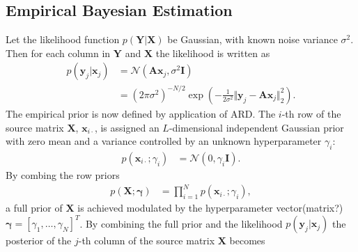 \subsection{Empirical Bayesian Estimation}
Let the likelihood function $p(\mathbf{Y} \vert \mathbf{X})$ be Gaussian, with known noise variance $\sigma^2$. 
Then for each column in $\mathbf{Y}$ and $\mathbf{X}$ the likelihood is written as
\begin{align*}
p(\mathbf{y}_{j} \vert \mathbf{x}_{j}) &= \mathcal{N}(\mathbf{Ax}_{j}, \sigma^2 \mathbf{I}) \\
&= (2 \pi \sigma^2)^{-N/2} \exp \left( - \frac{1}{2 \sigma^2} \Vert \mathbf{y}_{j} - \mathbf{A} \mathbf{x}_{j} \Vert_2^2 \right).
\end{align*}
The empirical prior is now defined by application of ARD. 
The $i$-th row of the source matrix $\mathbf{X}$, $\mathbf{x}_{i \cdot}$, is assigned an $L$-dimensional independent Gaussian prior with zero mean and a variance controlled by an unknown hyperparameter $\gamma_i$:
\begin{align*}
p (\mathbf{x}_{i \cdot} ; \gamma_i) &= \mathcal{N}(0, \gamma_i \mathbf{I}).
\end{align*}
By combing the row priors
\begin{align*}
p (\mathbf{X} ; \boldsymbol{\gamma}) &= \prod_{i=1}^N p (\mathbf{x}_{i \cdot} ; \gamma_i),
\end{align*}
a full prior of $\mathbf{X}$ is achieved modulated by the hyperparameter vector(matrix?) $\boldsymbol{\gamma} = [\gamma_1, \dots, \gamma_N]^T$. 
By combining the full prior and the likelihood $p(\mathbf{y}_{j} \vert \mathbf{x}_{j})$ the posterior of the $j$-th column of the source matrix $\mathbf{X}$ becomes
